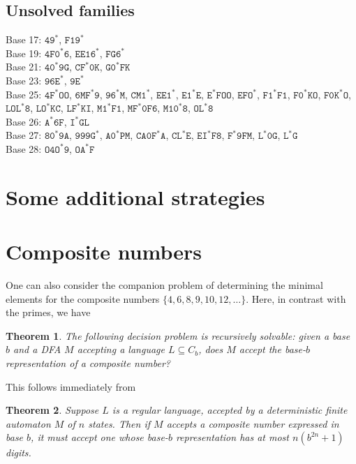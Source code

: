 \documentclass[12pt]{article}
\theoremstyle{plain}
\newtheorem{theorem}{Theorem}
\theoremstyle{definition}
\theoremstyle{remark}
\newcommand{\0}{\mathtt{0}}
\newcommand{\1}{\mathtt{1}}
\newcommand{\2}{\mathtt{2}}
\newcommand{\3}{\mathtt{3}}
\newcommand{\4}{\mathtt{4}}
\newcommand{\5}{\mathtt{5}}
\newcommand{\6}{\mathtt{6}}
\newcommand{\7}{\mathtt{7}}
\newcommand{\8}{\mathtt{8}}
\newcommand{\9}{\mathtt{9}}
\begin{document}
\subsection{Unsolved families}
Base 17: $\mathtt{49^*}$, $\mathtt{F19^*}$ \\
Base 19: $\mathtt{4F0^*6}$, $\mathtt{EE16^*}$, $\mathtt{FG6^*}$ \\
Base 21: $\mathtt{40^*9G}$, $\mathtt{CF^*0K}$, $\mathtt{G0^*FK}$ \\
Base 23: $\mathtt{96E^*}$, $\mathtt{9E^*}$ \\
Base 25: $\mathtt{4F^*OO}$, $\mathtt{6MF^*9}$, $\mathtt{96^*M}$, $\mathtt{CM1^*}$, $\mathtt{EE1^*}$, $\mathtt{E1^*E}$, $\mathtt{E^*FOO}$, $\mathtt{EFO^*}$, $\mathtt{F1^*F1}$, $\mathtt{F0^*KO}$, $\mathtt{F0K^*O}$, $\mathtt{LOL^*8}$, $\mathtt{LO^*KC}$, $\mathtt{LF^*KI}$, $\mathtt{M1^*F1}$, $\mathtt{MF^*0F6}$, $\mathtt{M10^*8}$, $\mathtt{OL^*8}$ \\
Base 26: $\mathtt{A^*6F}$, $\mathtt{I^*GL}$ \\
Base 27: $\mathtt{80^*9A}$, $\mathtt{999G^*}$, $\mathtt{A0^*PM}$, $\mathtt{CA0F^*A}$, $\mathtt{CL^*E}$, $\mathtt{EI^*F8}$, $\mathtt{F^*9FM}$, $\mathtt{L^*0G}$, $\mathtt{L^*G}$ \\
Base 28: $\mathtt{O4O^*9}$, $\mathtt{OA^*F}$

\section{Some additional strategies}

\section{Composite numbers}

One can also consider the companion problem of determining the
minimal elements for the composite numbers
$\lbrace 4,6,8,9,10, 12, \ldots \rbrace $.  
Here, in contrast with the primes, we have

\begin{theorem}
The following decision problem is recursively solvable:  given
a base $b$ and a DFA $M$ accepting a language $L \subseteq 
C_b$, does $M$ accept the base-$b$ representation of a composite 
number?
\end{theorem}

This follows immediately from

\begin{theorem}
Suppose $L$ is a regular language, accepted by a 
deterministic finite automaton $M$ of $n$ states.  Then
if $M$ accepts a composite number expressed in base $b$, it must
accept one whose base-$b$ representation has at most
$n(b^{2n} + 1)$ digits.
\end{theorem}
\end{document}
